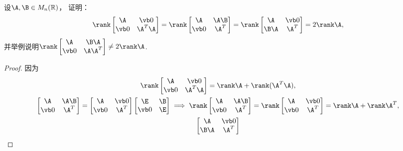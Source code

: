 \begin{example}
设\(\A,\B \in M_n(\mathbb{R})\)，
证明：\begin{equation*}
	\rank\begin{bmatrix}
		\A & \vb0 \\
		\vb0 & \A^T \A
	\end{bmatrix}
	= \rank\begin{bmatrix}
		\A & \A \B \\
		\vb0 & \A^T
	\end{bmatrix}
	= \rank\begin{bmatrix}
		\A & \vb0 \\
		\B \A & \A^T
	\end{bmatrix}
	= 2 \rank\A,
\end{equation*}
并举例说明\(\rank\begin{bmatrix}
	\A & \B \A \\
	\vb0 & \A \A^T
\end{bmatrix}
\neq 2 \rank\A\).
\begin{proof}
因为\begin{gather*}
	\rank\begin{bmatrix}
		\A & \vb0 \\
		\vb0 & \A^T \A
	\end{bmatrix}
	= \rank\A + \rank(\A^T \A), \\
	\begin{bmatrix}
		\A & \A \B \\
		\vb0 & \A^T
	\end{bmatrix}
	= \begin{bmatrix}
		\A & \vb0 \\
		\vb0 & \A^T
	\end{bmatrix}
	\begin{bmatrix}
		\E & \B \\
		\vb0 & \E
	\end{bmatrix}
	\implies
	\rank\begin{bmatrix}
		\A & \A \B \\
		\vb0 & \A^T
	\end{bmatrix}
	= \rank\begin{bmatrix}
		\A & \vb0 \\
		\vb0 & \A^T
	\end{bmatrix}
	= \rank\A + \rank\A^T, \\
	\begin{bmatrix}
		\A & \vb0 \\
		\B \A & \A^T
	\end{bmatrix}

\end{gather*}
\end{proof}
\end{example}
